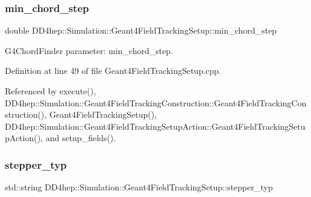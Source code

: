 \hypertarget{struct_d_d4hep_1_1_simulation_1_1_geant4_field_tracking_setup_a1ffabcaa88a6f30609794dc2f4c01d22}{}\label{struct_d_d4hep_1_1_simulation_1_1_geant4_field_tracking_setup_a1ffabcaa88a6f30609794dc2f4c01d22} 
\subsubsection{\texorpdfstring{min\+\_\+chord\+\_\+step}{min\_chord\_step}}
{\footnotesize\ttfamily double D\+D4hep\+::\+Simulation\+::\+Geant4\+Field\+Tracking\+Setup\+::min\+\_\+chord\+\_\+step\hspace{0.3cm}{\ttfamily [protected]}}



G4\+Chord\+Finder parameter\+: min\+\_\+chord\+\_\+step. 



Definition at line 49 of file Geant4\+Field\+Tracking\+Setup.\+cpp.



Referenced by execute(), D\+D4hep\+::\+Simulation\+::\+Geant4\+Field\+Tracking\+Construction\+::\+Geant4\+Field\+Tracking\+Construction(), Geant4\+Field\+Tracking\+Setup(), D\+D4hep\+::\+Simulation\+::\+Geant4\+Field\+Tracking\+Setup\+Action\+::\+Geant4\+Field\+Tracking\+Setup\+Action(), and setup\+\_\+fields().

\hypertarget{struct_d_d4hep_1_1_simulation_1_1_geant4_field_tracking_setup_ab9e3cc336df0378ecdb3706c03347f9c}{}\label{struct_d_d4hep_1_1_simulation_1_1_geant4_field_tracking_setup_ab9e3cc336df0378ecdb3706c03347f9c} 
\subsubsection{\texorpdfstring{stepper\+\_\+typ}{stepper\_typ}}
{\footnotesize\ttfamily std\+::string D\+D4hep\+::\+Simulation\+::\+Geant4\+Field\+Tracking\+Setup\+::stepper\+\_\+typ\hspace{0.3cm}{\ttfamily [protected]}}



